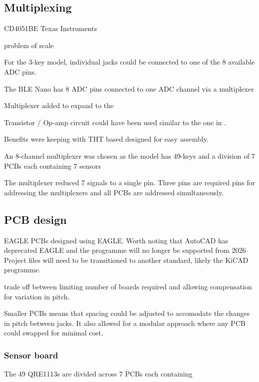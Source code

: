 \subsection{Multiplexing}\label{multiplexing}

CD4051BE Texas Instruments

problem of scale

For the 3-key model, individual jacks could be connected to one of the 8
available ADC pins.

The BLE Nano has 8 ADC pins connected to one ADC channel via a
multiplexer

Multiplexer added to expand to the

Transistor / Op-amp circuit could have been used similar to the one in
\cite{McPherson2013}.

Benefits were keeping with THT based designed for easy assembly.

An 8-channel multiplexer was chosen as the model has 49-keys and a
division of 7 PCBs each containing 7 sensors

The multiplexer reduced 7 signals to a single pin. Three pins are
required pins for addressing the multiplexers and all PCBs are addressed
simultaneously.

\subsection{PCB design}\label{pcb-design}


EAGLE PCBs designed using EAGLE. Worth noting that AutoCAD has
deprecated EAGLE and the programme will no longer be supported from
2026 Project files will need to be transitioned to another standard,
likely the KiCAD programme.

trade off between limiting number of boards required and allowing
compensation for variation in pitch.

Smaller PCBs means that spacing could be adjusted to accomodate the
changes in pitch between jacks. It also allowed for a modular approach
where any PCB could swapped for minimal cost.

\subsubsection{Sensor board}\label{sensor-board}

The 49 QRE1113s are divided across 7 PCBs each containing

